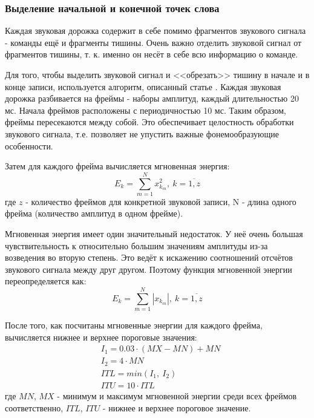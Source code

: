 \subsubsection{Выделение начальной и конечной точек слова}
Каждая звуковая дорожка содержит в себе помимо фрагментов звукового сигнала - команды ещё и фрагменты тишины. Очень важно отделить звуковой сигнал от фрагментов тишины, т. к. именно он несёт в себе всю информацию о команде. 

Для того, чтобы выделить звуковой сигнал и <<обрезать>> тишину в начале и в конце записи, используется алгоритм, описанный статье \cite{SignalPreprocessing}. 
Каждая звуковая дорожка разбивается на фреймы - наборы амплитуд, каждый длительностью 20 мс. Начала фреймов расположены с периодичностью 10 мс. Таким образом, фреймы пересекаются между собой. Это обеспечивает целостность обработки звукового сигнала, т.е. позволяет не упустить важные фонемообразующие особенности.

Затем для каждого фрейма вычисляется мгновенная энергия:
\begin{equation}
E_k = \sum_{m=1}^{N} x_{k_m}^2,~k=\overline{1,z}
\end{equation}
где $z$ - количество фреймов для конкретной звуковой записи, N - длина одного фрейма (количество амплитуд в одном фрейме).

Мгновенная энергия имеет один значительный недостаток. У неё очень большая чувствительность к относительно большим значениям амплитуды из-за возведения во вторую степень. Это ведёт к искажению соотношений отсчётов звукового сигнала между друг другом. Поэтому функция мгновенной энергии переопределяется как:
\begin{equation}
\label{eq:instant_energy}
E_k = \sum_{m=1}^{N} |x_{k_m}|,~k=\overline{1,z}
\end{equation}

После того, как посчитаны мгновенные энергии для каждого фрейма, вычисляется нижнее и верхнее пороговые значения:
\begin{equation}
\begin{aligned}
& I_1 = 0.03 \cdot (MX - MN) + MN \\
& I_2 = 4 \cdot MN \\
& ITL = min(I_1,~I_2)\\
& ITU = 10 \cdot ITL
\end{aligned}
\end{equation}
где $MN$, $MX$ - минимум и максимум мгновенной энергии среди всех фреймов соответственно, $ITL$, $ITU$ - нижнее и верхнее пороговое значение.

